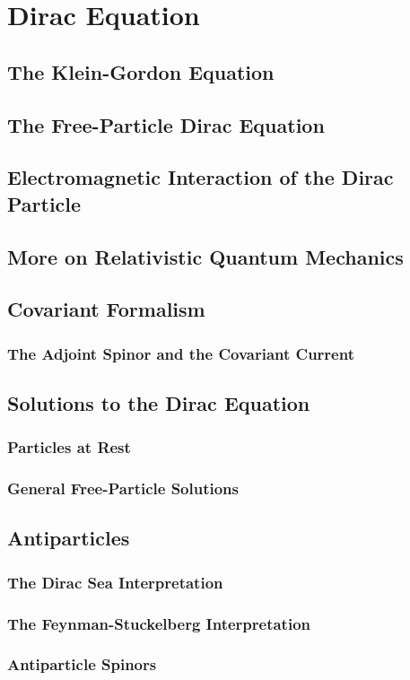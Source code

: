 \chapter{Dirac Equation}
\section{The Klein-Gordon Equation}
\section{The Free-Particle Dirac Equation}
\section{Electromagnetic Interaction of the Dirac Particle}
\section{More on Relativistic Quantum Mechanics}
\section{Covariant Formalism}
\subsection{The Adjoint Spinor and the Covariant Current}
\section{Solutions to the Dirac Equation}
\subsection{Particles at Rest}
\subsection{General Free-Particle Solutions}
\section{Antiparticles}
\subsection{The Dirac Sea Interpretation}
\subsection{The Feynman-Stuckelberg Interpretation}
\subsection{Antiparticle Spinors}